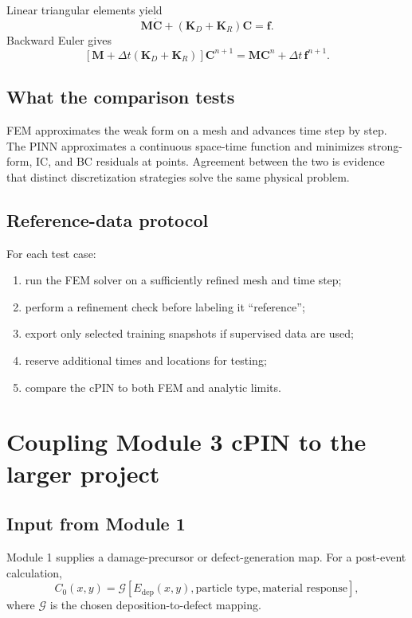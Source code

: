 \documentclass[11pt]{article}
\begin{document}
Linear triangular elements yield
\begin{equation}
\mathbf{M}\dot{\mathbf C}
+(\mathbf{K}_D+\mathbf{K}_R)\mathbf C
=
\mathbf f.
\end{equation}
Backward Euler gives
\begin{equation}
\left[
\mathbf M+\Delta t(\mathbf K_D+\mathbf K_R)
\right]\mathbf C^{n+1}
=
\mathbf M\mathbf C^n+\Delta t\,\mathbf f^{n+1}.
\label{eq:fem_be}
\end{equation}

\subsection{What the comparison tests}

FEM approximates the weak form on a mesh and advances time step by step. The PINN approximates a continuous space-time function and minimizes strong-form, IC, and BC residuals at points. Agreement between the two is evidence that distinct discretization strategies solve the same physical problem.

\subsection{Reference-data protocol}

For each test case:
\begin{enumerate}[label=\arabic*.]
    \item run the FEM solver on a sufficiently refined mesh and time step;
    \item perform a refinement check before labeling it ``reference'';
    \item export only selected training snapshots if supervised data are used;
    \item reserve additional times and locations for testing;
    \item compare the cPIN to both FEM and analytic limits.
\end{enumerate}

\section{Coupling Module 3 cPIN to the larger project}

\subsection{Input from Module 1}

Module 1 supplies a damage-precursor or defect-generation map. For a post-event calculation,
\begin{equation}
C_0(x,y)
=
\mathcal{G}
\left[
E_{\mathrm{dep}}(x,y),\text{particle type},\text{material response}
\right],
\end{equation}
where $\mathcal{G}$ is the chosen deposition-to-defect mapping.
\end{document}
